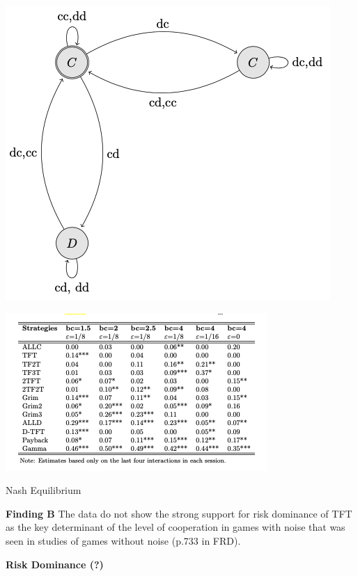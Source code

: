 \documentclass{beamer}
\begin{document}
\begin{frame}
    \centering
    \includegraphics[width=.75\textwidth]{static/payback}
\end{frame}

\begin{frame}
    \centering
    \includegraphics[width=.75\textwidth]{static/result A.1.png}
\end{frame}

\begin{frame}
    \begin{center}
    \LARGE{Nash Equilibrium}
    \end{center}
\end{frame}

\begin{frame}
    \centering
    \textbf{Finding B} The data do not show the strong support for risk
    dominance of TFT as the key determinant of the level of cooperation in
    games with noise that was seen in studies of games without noise (p.733 in
    FRD).
\end{frame}

\begin{frame}
    \begin{center}
    \LARGE{\textbf{Risk Dominance (?)}}
    \end{center}
\end{frame}
\end{document}
